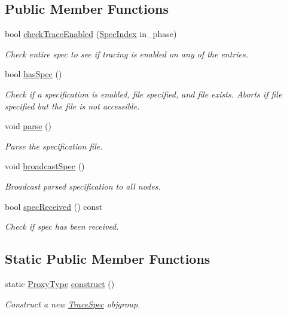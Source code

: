 \subsection*{Public Member Functions}
\begin{DoxyCompactItemize}
\item 
bool \hyperlink{structvt_1_1trace_1_1file__spec_1_1_trace_spec_adf331a01f94b57cb9229c89311f1bcda}{check\+Trace\+Enabled} (\hyperlink{structvt_1_1trace_1_1file__spec_1_1_trace_spec_a4dd2e8fb971930351812d0f286baece2}{Spec\+Index} in\+\_\+phase)
\begin{DoxyCompactList}\small\item\em Check entire spec to see if tracing is enabled on any of the entries. \end{DoxyCompactList}\item 
bool \hyperlink{structvt_1_1trace_1_1file__spec_1_1_trace_spec_ad83e3bc71e3ebcd794fc38e7c2b7a74c}{has\+Spec} ()
\begin{DoxyCompactList}\small\item\em Check if a specification is enabled, file specified, and file exists. Aborts if file specified but the file is not accessible. \end{DoxyCompactList}\item 
void \hyperlink{structvt_1_1trace_1_1file__spec_1_1_trace_spec_ac336bccc75406f56c2888b07e73e9355}{parse} ()
\begin{DoxyCompactList}\small\item\em Parse the specification file. \end{DoxyCompactList}\item 
void \hyperlink{structvt_1_1trace_1_1file__spec_1_1_trace_spec_a3a5ececf49f827a057a7bea8ac7e7584}{broadcast\+Spec} ()
\begin{DoxyCompactList}\small\item\em Broadcast parsed specification to all nodes. \end{DoxyCompactList}\item 
bool \hyperlink{structvt_1_1trace_1_1file__spec_1_1_trace_spec_aba7577d831109f8459e5378db392e717}{spec\+Received} () const
\begin{DoxyCompactList}\small\item\em Check if spec has been received. \end{DoxyCompactList}\end{DoxyCompactItemize}
\subsection*{Static Public Member Functions}
\begin{DoxyCompactItemize}
\item 
static \hyperlink{structvt_1_1trace_1_1file__spec_1_1_trace_spec_a26160cff9bb5115866943ed823405f1f}{Proxy\+Type} \hyperlink{structvt_1_1trace_1_1file__spec_1_1_trace_spec_a66e362b05b4af9a4e4ef514a4e272599}{construct} ()
\begin{DoxyCompactList}\small\item\em Construct a new {\ttfamily \hyperlink{structvt_1_1trace_1_1file__spec_1_1_trace_spec}{Trace\+Spec}} objgroup. \end{DoxyCompactList}\end{DoxyCompactItemize}
